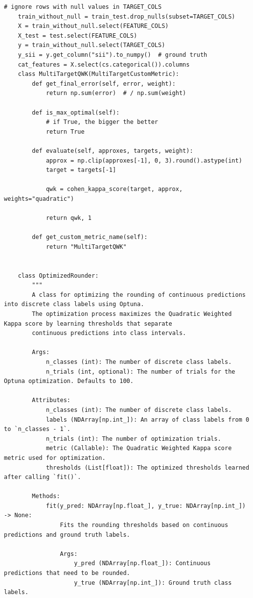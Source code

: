 \begin{appendices}
\begin{mdframed}
\begin{lstlisting}[breaklines=true]
    # ignore rows with null values in TARGET_COLS
    train_without_null = train_test.drop_nulls(subset=TARGET_COLS)
    X = train_without_null.select(FEATURE_COLS)
    X_test = test.select(FEATURE_COLS)
    y = train_without_null.select(TARGET_COLS)
    y_sii = y.get_column("sii").to_numpy()  # ground truth
    cat_features = X.select(cs.categorical()).columns
    class MultiTargetQWK(MultiTargetCustomMetric):
        def get_final_error(self, error, weight):
            return np.sum(error)  # / np.sum(weight)

        def is_max_optimal(self):
            # if True, the bigger the better
            return True

        def evaluate(self, approxes, targets, weight):
            approx = np.clip(approxes[-1], 0, 3).round().astype(int)
            target = targets[-1]

            qwk = cohen_kappa_score(target, approx, weights="quadratic")

            return qwk, 1

        def get_custom_metric_name(self):
            return "MultiTargetQWK"


    class OptimizedRounder:
        """
        A class for optimizing the rounding of continuous predictions into discrete class labels using Optuna.
        The optimization process maximizes the Quadratic Weighted Kappa score by learning thresholds that separate
        continuous predictions into class intervals.

        Args:
            n_classes (int): The number of discrete class labels.
            n_trials (int, optional): The number of trials for the Optuna optimization. Defaults to 100.

        Attributes:
            n_classes (int): The number of discrete class labels.
            labels (NDArray[np.int_]): An array of class labels from 0 to `n_classes - 1`.
            n_trials (int): The number of optimization trials.
            metric (Callable): The Quadratic Weighted Kappa score metric used for optimization.
            thresholds (List[float]): The optimized thresholds learned after calling `fit()`.

        Methods:
            fit(y_pred: NDArray[np.float_], y_true: NDArray[np.int_]) -> None:
                Fits the rounding thresholds based on continuous predictions and ground truth labels.

                Args:
                    y_pred (NDArray[np.float_]): Continuous predictions that need to be rounded.
                    y_true (NDArray[np.int_]): Ground truth class labels.


\end{lstlisting}
\end{mdframed}
\end{appendices}
